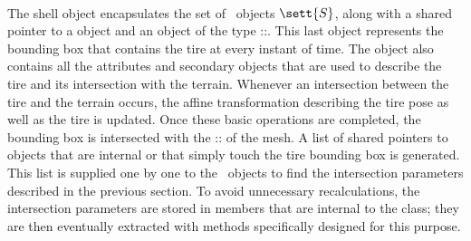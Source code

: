 \paragraph{\Shell{}}
The shell object encapsulates the set of~\Rib{} objects $\sett{S}$, along with a shared pointer to a \Shape{} object and an object of the type \Acme{}::\Aabb{}. This last object represents the bounding box that contains the tire at every instant of time. The \Shell{} object also contains all the attributes and secondary objects that are used to describe the tire and its intersection with the terrain. Whenever an intersection between the tire and the terrain occurs, the affine transformation describing the tire pose as well as the tire \Aabb{} is updated. Once these basic operations are completed, the bounding box is intersected with the \Acme{}::\AabbTree{} of the mesh. A list of shared pointers to \TriangleGround{} objects that are internal or that simply touch the tire bounding box is generated. This list is supplied one by one to the~\Rib{} objects to find the intersection parameters described in the previous section. To avoid unnecessary recalculations, the intersection parameters are stored in members that are internal to the \Shell{} class; they are then eventually extracted with methods specifically designed for this purpose.




